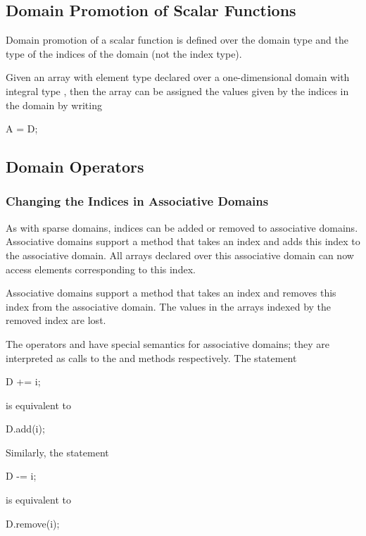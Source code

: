 \subsection{Domain Promotion of Scalar Functions}
\label{Domain_Promotion_of_Scalar_Functions}

Domain promotion of a scalar function is defined over the domain type
and the type of the indices of the domain (not the index type).

\begin{example}
Given an array  with element type  declared over a
one-dimensional domain  with integral type , then
the array can be assigned the values given by the indices in the
domain by writing
\begin{chapel}
A = D;
\end{chapel}
\end{example}


\subsection{Domain Operators}

\subsubsection{Changing the Indices in Associative Domains}

As with sparse domains, indices can be added or removed to associative
domains.  Associative domains support a method  that takes
an index and adds this index to the associative domain.  All arrays
declared over this associative domain can now access elements
corresponding to this index.

Associative domains support a method  that takes an index
and removes this index from the associative domain.  The values in the
arrays indexed by the removed index are lost.

The operators \chpl{+=} and \chpl{-=} have special semantics for
associative domains; they are interpreted as calls to the 
and  methods respectively.  The statement
\begin{chapel}
D += i;
\end{chapel}
is equivalent to
\begin{chapel}
D.add(i);
\end{chapel}
Similarly, the statement
\begin{chapel}
D -= i;
\end{chapel}
is equivalent to
\begin{chapel}
D.remove(i);
\end{chapel}

